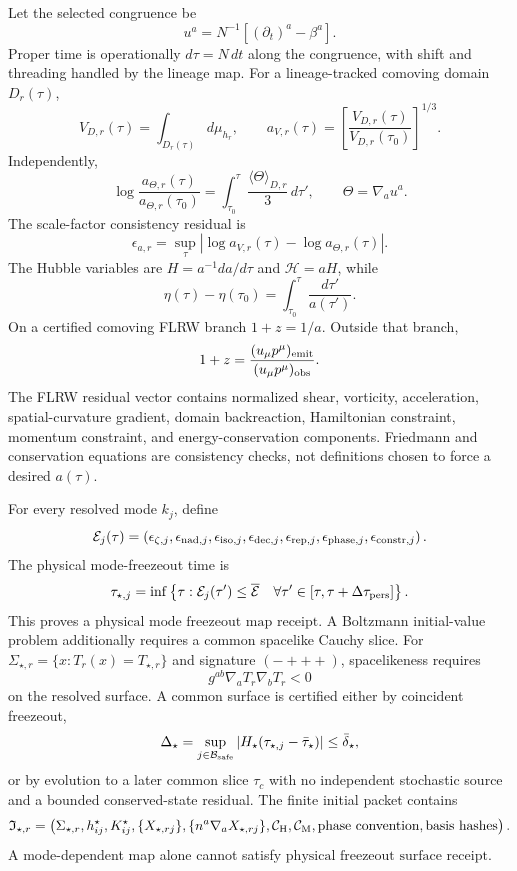 \begin{theorem}\label{thm:physical-time-scale}
Let the selected congruence be
\[
u^a=N^{-1}\left[(\partial_t)^a-\beta^a\right].
\]
Proper time is operationally \(d\tau=N\,dt\) along the congruence, with shift and threading handled
by the lineage map.  For a lineage-tracked comoving domain \(D_r(\tau)\),
\[
V_{D,r}(\tau)=\int_{D_r(\tau)}d\mu_{h_r},\qquad
a_{V,r}(\tau)=
\left[\frac{V_{D,r}(\tau)}{V_{D,r}(\tau_0)}\right]^{1/3}.
\]
Independently,
\[
\log\frac{a_{\Theta,r}(\tau)}{a_{\Theta,r}(\tau_0)}
=
\int_{\tau_0}^{\tau}
\frac{\langle\Theta\rangle_{D,r}}{3}\,d\tau',
\qquad
\Theta=\nabla_a u^a.
\]
The scale-factor consistency residual is
\[
\epsilon_{a,r}=
\sup_\tau
\left|\log a_{V,r}(\tau)-\log a_{\Theta,r}(\tau)\right|.
\]
The Hubble variables are \(H=a^{-1}da/d\tau\) and \(\mathcal H=aH\), while
\[
\eta(\tau)-\eta(\tau_0)=\int_{\tau_0}^{\tau}\frac{d\tau'}{a(\tau')}.
\]
On a certified comoving FLRW branch \(1+z=1/a\).  Outside that branch,
\[
1+z=\frac{(u_\mu p^\mu)_{\rm emit}}{(u_\mu p^\mu)_{\rm obs}}.
\]
The FLRW residual vector contains normalized shear, vorticity, acceleration, spatial-curvature
gradient, domain backreaction, Hamiltonian constraint, momentum constraint, and energy-conservation
components.  Friedmann and conservation equations are consistency checks, not definitions chosen to
force a desired \(a(\tau)\).
\end{theorem}

\begin{theorem}\label{thm:mode-freezeout-common-surface}
For every resolved mode \(k_j\), define
\[
\mathcal E_j(\tau)=
\left(
\epsilon_{\zeta,j},
\epsilon_{{\rm nad},j},
\epsilon_{{\rm iso},j},
\epsilon_{{\rm dec},j},
\epsilon_{{\rm rep},j},
\epsilon_{{\rm phase},j},
\epsilon_{{\rm constr},j}
\right).
\]
The physical mode-freezeout time is
\[
\tau_{\star,j}=
\inf\left\{
\tau:\mathcal E_j(\tau')\le\overline{\mathcal E}
\quad\forall \tau'\in[\tau,\tau+\Delta\tau_{\rm pers}]
\right\}.
\]
This proves a \(\text{physical mode freezeout map receipt}\).  A Boltzmann initial-value
problem additionally requires a common spacelike Cauchy slice.  For
\(\Sigma_{\star,r}=\{x:T_r(x)=T_{\star,r}\}\) and signature \((-+++)\), spacelikeness requires
\[
g^{ab}\nabla_aT_r\nabla_bT_r<0
\]
on the resolved surface.  A common surface is certified either by coincident freezeout,
\[
\Delta_\star=
\sup_{j\in\mathcal B_{\rm safe}}
\left|H_\star(\tau_{\star,j}-\bar\tau_\star)\right|
\le\bar\delta_\star,
\]
or by evolution to a later common slice \(\tau_c\) with no independent stochastic source and a
bounded conserved-state residual.  The finite initial packet contains
\[
\mathfrak I_{\star,r}=
\left(
\Sigma_{\star,r},h_{ij}^\star,K_{ij}^\star,
\{X_{\star,rj}\},\{n^a\nabla_aX_{\star,rj}\},
\mathcal C_{\rm H},\mathcal C_{\rm M},
\hbox{phase convention},\hbox{basis hashes}
\right).
\]
A mode-dependent map alone cannot satisfy
\(\text{physical freezeout surface receipt}\).
\end{theorem}

